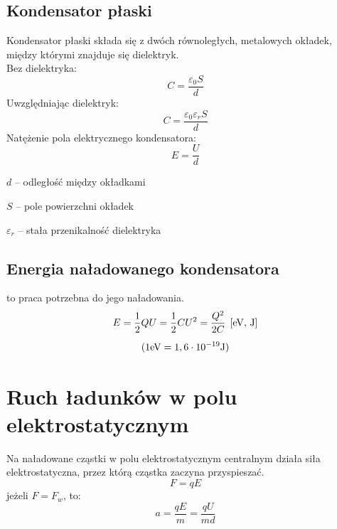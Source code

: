 \subsection{Kondensator płaski}
\begin{definition}
  Kondensator płaski składa się z dwóch równoległych, metalowych okładek, między którymi znajduje
  się dielektryk.\\[1.5em]
  Bez dielektryka:
  \begin{equation*}
    C = \frac{\varepsilon_0 S}{d}
  \end{equation*}
  Uwzględniając dielektryk:
  \begin{equation*}
    C = \frac{\varepsilon_0 \varepsilon_r S}{d}
  \end{equation*}
  Natężenie pola elektrycznego kondensatora:
  \begin{equation*}
    E = \frac Ud
  \end{equation*}
  \begin{symbols}
    \item $d$ -- odległość między okładkami
    \item $S$ -- pole powierzchni okładek
    \item $\varepsilon_r$ -- stała przenikalność dielektryka
  \end{symbols}
\end{definition}

\subsection{Energia naładowanego kondensatora}
\begin{definition}
   to praca potrzebna do jego naładowania.
  \begin{gather*}
    E = \frac 12 QU = \frac 12 CU^2 = \frac{Q^2}{2C} \;\left[\mathrm{eV},\,\mathrm{J}\right]\\[0.5em]
    (1\mathrm{eV} = 1,6\cdot 10^{-19} \mathrm{J})
  \end{gather*}
\end{definition}

\section{Ruch ładunków w polu elektrostatycznym}
Na naładowane cząstki w polu elektrostatycznym centralnym działa siła elektrostatyczna, przez którą
cząstka zaczyna przyspieszać.
\begin{equation*}
  F = qE
\end{equation*}
jeżeli $F = F_w$, to:
\begin{equation*}
  a = \frac{qE}{m} = \frac{qU}{md}
\end{equation*}

